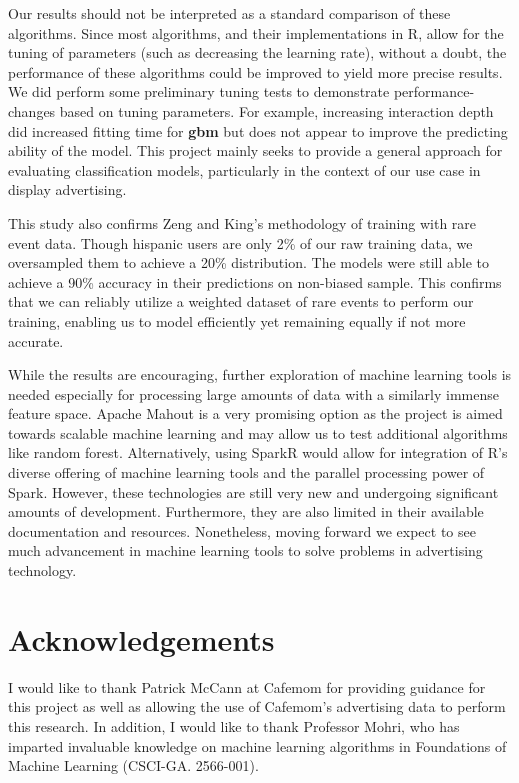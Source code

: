 \documentclass[twoside]{article}
\begin{document}
\begin{multicols}{2}
Our results should not be interpreted as a standard comparison of these algorithms. Since most algorithms, and their implementations in R, allow for the tuning of parameters (such as decreasing the learning rate), without a doubt, the performance of these algorithms could be improved to yield more precise results. We did perform some preliminary tuning tests to demonstrate performance-changes based on tuning parameters. For example, increasing interaction depth did increased fitting time for \textbf{gbm} but does not appear to improve the predicting ability of the model. This project mainly seeks to provide a general approach for evaluating classification models, particularly in the context of our use case in display advertising.

This study also confirms Zeng and King's methodology of training with rare event data. Though hispanic users are only 2\% of our raw training data, we oversampled them to achieve a 20\% distribution. The models were still able to achieve a 90\% accuracy in their predictions on non-biased sample. This confirms that we can reliably utilize a weighted dataset of rare events to perform our training, enabling us to model efficiently yet remaining equally if not more accurate.

While the results are encouraging, further exploration of machine learning tools is needed especially for processing large amounts of data with a similarly immense feature space. Apache Mahout is a very promising option as the project is aimed towards scalable machine learning and may allow us to test additional algorithms like random forest\cite{18}. Alternatively, using SparkR would allow for integration of R's diverse offering of machine learning tools and the parallel processing power of Spark\cite{8}. However, these technologies are still very new and undergoing significant amounts of development. Furthermore, they are also limited in their available documentation and resources. Nonetheless, moving forward we expect to see much advancement in machine learning tools to solve problems in advertising technology.


\section{Acknowledgements}

I would like to thank Patrick McCann at Cafemom for providing guidance for this project as well as allowing the use of Cafemom's advertising data to perform this research. In addition, I would like to thank Professor Mohri, who has imparted invaluable knowledge on machine learning algorithms in Foundations of Machine Learning (CSCI-GA. 2566-001).


\end{multicols}
\end{document}
